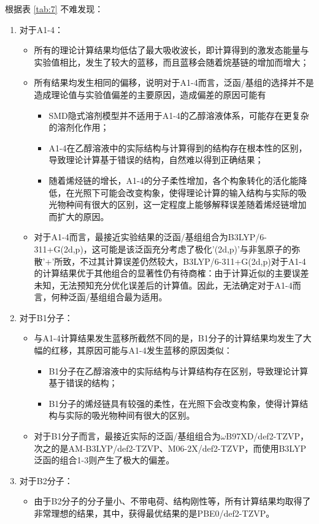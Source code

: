 \newpage
根据表 \ref{tab:7} 不难发现：
\begin{enumerate}
    \item 对于A1-4：
    \begin{itemize}
        \item 所有的理论计算结果均低估了最大吸收波长，即计算得到的激发态能量与实验值相比，发生了较大的蓝移，而且蓝移会随着烷基链的增加而增大；
        \item 所有结果均发生相同的偏移，说明对于A1-4而言，泛函/基组的选择并不是造成理论值与实验值偏差的主要原因，造成偏差的原因可能有
        \begin{itemize}
            \item SMD隐式溶剂模型并不适用于A1-4的乙醇溶液体系，可能存在更复杂的溶剂化作用；
            \item A1-4在乙醇溶液中的实际结构与计算得到的结构存在根本性的区别，导致理论计算基于错误的结构，自然难以得到正确结果；
            \item 随着烯烃链的增长，A1-4的分子柔性增加，各个构象转化的活化能降低，在光照下可能会改变构象，使得理论计算的输入结构与实际的吸光物种间有很大的区别，这一定程度上能够解释误差随着烯烃链增加而扩大的原因。
        \end{itemize}
        \item 对于A1-4而言，最接近实验结果的泛函/基组组合为B3LYP/6-311+G(2d,p)，这可能是该泛函充分考虑了极化'(2d,p)'与非氢原子的弥散'+'所致，不过其计算误差仍然较大，B3LYP/6-311+G(2d,p)对于A1-4的计算结果优于其他组合的显著性仍有待商榷：由于计算近似的主要误差未知，无法预知充分优化误差后的计算值。因此，无法确定对于A1-4而言，何种泛函/基组组合最为适用。
    \end{itemize} 
    \item 对于B1分子：
    \begin{itemize}
        \item 与A1-4计算结果发生蓝移所截然不同的是，B1分子的计算结果均发生了大幅的红移，其原因可能与A1-4发生蓝移的原因类似：
        \begin{itemize}
            \item B1分子在乙醇溶液中的实际结构与计算结构存在区别，导致理论计算基于错误的结构；
            \item B1分子的烯烃链具有较强的柔性，在光照下会改变构象，使得计算结构与实际的吸光物种间有很大的区别。
        \end{itemize}
        \item 对于B1分子而言，最接近实际的泛函/基组组合为$\omega$B97XD/def2-TZVP，次之的是AM-B3LYP/def2-TZVP、M06-2X/def2-TZVP，而使用B3LYP泛函的组合1-3则产生了极大的偏差。
    \end{itemize}
    \item 对于B2分子：
    \begin{itemize}
        \item 由于B2分子的分子量小、不带电荷、结构刚性等，所有计算结果均取得了非常理想的结果，其中，获得最优结果的是PBE0/def2-TZVP。
    \end{itemize}
\end{enumerate}

